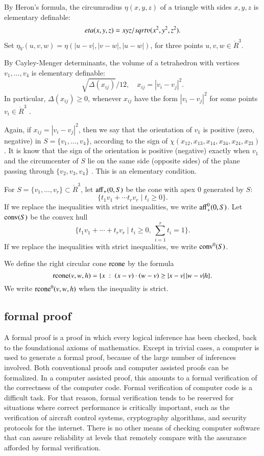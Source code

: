 By Heron's formula, the circumradius $\eta(x,y,z)$ of a triangle with sides $x,y,z$ is elementary definable:
$$\eta(x,y,z) = x y z/\sqrt{\ups(x^2,y^2,z^2)}.$$
Set $\eta_V(u,v,w) = \eta(|u-v|,|v-w|,|u-w|)$, for three points
$u,v,w\in\ring{R}^3$.

By Cayley-Menger determinants, the volume  of a tetrahedron with vertices $v_1,\ldots,v_4$ is elementary definable:
   $$
   \sqrt{\Delta(x_{ij})}/12,\quad x_{ij}=|v_i-v_j|^2.
   $$
In particular, $\Delta(x_{ij})\ge0$, whenever $x_{ij}$ have
the form $|v_i-v_j|^2$ for some points $v_i\in\ring{R}^3$
\cite[Lemma~8.1.4]{SPI}.

Again, if $x_{ij}=|v_i-v_j|^2$, then we say that the orientation
of $v_1$ is positive (zero, negative) in $S=\{v_1,\ldots,v_4\}$,
according to the sign of $\chi(x_{12},x_{13},x_{14},x_{34},x_{24},x_{23})$.
It is know that the sign of the orientation is positive (negative) exactly
when $v_1$ and the circumcenter of $S$ lie on the same side (opposite sides) of the
plane passing through $\{v_2,v_3,v_4\}$ \cite[Lemma~5.15]{DCG}.  This is an elementary condition. 

For $S=\{v_1,\ldots,v_r\}\subset\ring{R}^3$, let ${\operatorname{aff}}_+(0,S)$
be the cone with apex $0$ generated by $S$:
  $$
  \{ t_1 v_1 + \cdots t_r v_r \mid  t_i \ge 0\}.
  $$
If we replace the inequalities with strict inequalities, we
write ${\operatorname{aff}}_+^0(0,S)$.
Let ${\operatorname{conv}}(S)$ be the convex hull
  $$
  \{ t_1 v_1 + \cdots + t_r v_r \mid t_i \ge 0,\ \sum_{i=1}^r t_i=1\}.
  $$
If we replace the inequalities with strict inequalities, we write
${\operatorname{conv}}^0(S)$.

We define the right circular cone ${\operatorname{rcone}}$ by the formula
$${\operatorname{rcone}}(v,w,h) = \{x\ :\  (x-v)\cdot (w-v) \ge |x-v|\,|w-v| h\}.$$
We write ${\operatorname{rcone}}^0(v,w,h)$ when the inequality is strict.





\subsection{formal proof}

A formal proof is a proof in which every logical inference has
been checked, back to the foundational axioms of mathematics. 
Except in trivial cases, a computer is used to generate a formal
proof, because of the large number of inferences involved.
Both conventional proofs and computer assisted proofs can be
formalized.  In a computer assisted proof, this amounts to a
formal verification of the correctness of the computer code.
Formal verification of computer code is a difficult task.
For that reason,  formal verification tends to be reserved
for situations where correct performance 
is critically important, such as the verification of aircraft
control systems, cryptography algorithms, 
and security protocols for the internet.
There is no other means of checking 
computer software that can assure reliability at levels that
remotely compare with the
assurance afforded by formal verification. 



